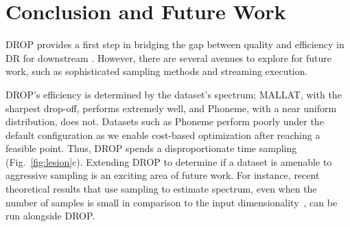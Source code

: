 \section{Conclusion and Future Work}
\label{subsec:disc}

DROP provides a first step in bridging the gap between quality and efficiency in DR for downstream .
However, there are several avenues to explore for future work, such as sophisticated sampling methods and streaming execution.


DROP's efficiency is determined by the dataset's spectrum; MALLAT, with the sharpest drop-off, performs extremely well, and Phoneme, with a near uniform distribution, does not.
Datasets such as Phoneme perform poorly under the default configuration as we enable cost-based optimization after reaching a feasible point.
Thus, DROP spends a disproportionate time sampling (Fig.~\ref{fig:lesion}c). 
Extending DROP to determine if a dataset is amenable to aggressive sampling is an exciting area of future work. 
For instance, recent theoretical results that use sampling to estimate spectrum, even when the number of samples is small in comparison to the input dimensionality~\cite{estspec}, can be run alongside DROP.

